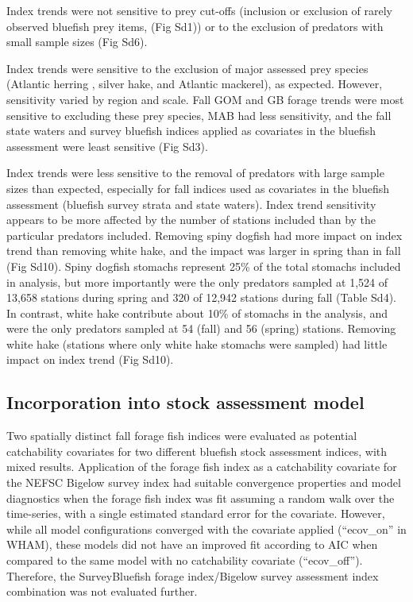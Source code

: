\documentclass[
]{article}
\begin{document}
Index trends were not sensitive to prey cut-offs (inclusion or exclusion of rarely observed bluefish prey items, (Fig Sd1)) or to the exclusion of predators with small sample sizes (Fig Sd6).

Index trends were sensitive to the exclusion of major assessed prey species (Atlantic herring , silver hake, and Atlantic mackerel), as expected. However, sensitivity varied by region and scale. Fall GOM and GB forage trends were most sensitive to excluding these prey species, MAB had less sensitivity, and the fall state waters and survey bluefish indices applied as covariates in the bluefish assessment were least sensitive (Fig Sd3).

Index trends were less sensitive to the removal of predators with large sample sizes than expected, especially for fall indices used as covariates in the bluefish assessment (bluefish survey strata and state waters). Index trend sensitivity appears to be more affected by the number of stations included than by the particular predators included. Removing spiny dogfish had more impact on index trend than removing white hake, and the impact was larger in spring than in fall (Fig Sd10). Spiny dogfish stomachs represent 25\% of the total stomachs included in analysis, but more importantly were the only predators sampled at 1,524 of 13,658 stations during spring and 320 of 12,942 stations during fall (Table Sd4). In contrast, white hake contribute about 10\% of stomachs in the analysis, and were the only predators sampled at 54 (fall) and 56 (spring) stations. Removing white hake (stations where only white hake stomachs were sampled) had little impact on index trend (Fig Sd10).

\hypertarget{incorporation-into-stock-assessment-model-1}{%
\subsection{Incorporation into stock assessment model}\label{incorporation-into-stock-assessment-model-1}}

Two spatially distinct fall forage fish indices were evaluated as potential catchability covariates for two different bluefish stock assessment indices, with mixed results. Application of the forage fish index as a catchability covariate for the NEFSC Bigelow survey index had suitable convergence properties and model diagnostics when the forage fish index was fit assuming a random walk over the time-series, with a single estimated standard error for the covariate. However, while all model configurations converged with the covariate applied (``ecov\_on'' in WHAM), these models did not have an improved fit according to AIC when compared to the same model with no catchability covariate (``ecov\_off''). Therefore, the SurveyBluefish forage index/Bigelow survey assessment index combination was not evaluated further.
\end{document}
